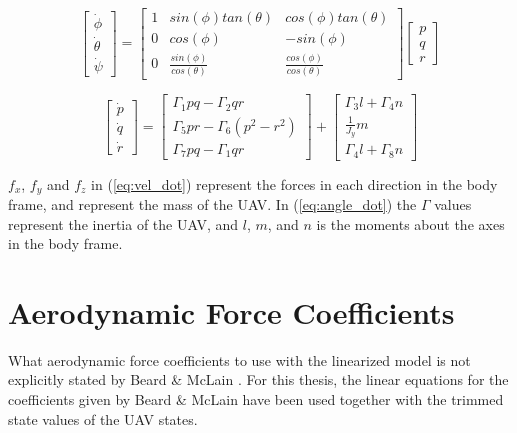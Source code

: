 \begin{equation}
	\begin{bmatrix}
		\dot{\phi} \\ \dot{\theta} \\ \dot{\psi}
	\end{bmatrix}
	=
	\begin{bmatrix}
		1 & sin(\phi)tan(\theta) & cos(\phi)tan(\theta) \\
		0 & cos(\phi) & -sin(\phi) \\
		0 & \frac{sin(\phi)}{cos(\theta)} & \frac{cos(\phi)}{cos(\theta)}
	\end{bmatrix}
	\begin{bmatrix}
		p \\ q \\ r
	\end{bmatrix}
\end{equation}

\begin{equation}
\label{eq:angle_dot}
	\begin{bmatrix}
		\dot{p} \\ \dot{q} \\ \dot{r}
	\end{bmatrix}
	=
	\begin{bmatrix}
		\Gamma_1pq - \Gamma_2qr \\
		\Gamma_5pr - \Gamma_6(p^2-r^2)\\
		\Gamma_7pq - \Gamma_1qr
	\end{bmatrix}
	+
	\begin{bmatrix}
		\Gamma_3l + \Gamma_4n \\
		\frac{1}{J_y}m\\
		\Gamma_4l + \Gamma_8n
	\end{bmatrix}
\end{equation}

$f_x$, $f_y$ and $f_z$ in (\ref{eq:vel_dot}) represent the forces in each direction in the body frame, and  represent the mass of the UAV. In (\ref{eq:angle_dot}) the $\Gamma$ values represent the inertia of the UAV, and $l$, $m$, and $n$ is the moments about the axes in the body frame.


\section{Aerodynamic Force Coefficients}

What aerodynamic force coefficients to use with the linearized model is not explicitly stated by Beard \& McLain \cite{uavBEARD}. For this thesis, the linear equations for the coefficients given by Beard \& McLain have been used together with the trimmed state values of the UAV states.

